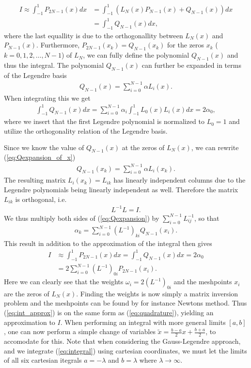 \documentclass[10pt, twocolumn]{aastex62}
\begin{document}
\begin{align}
	I \approx \int^1_{-1} P_{2N-1}(x) dx &= \int^1_{-1} (L_N(x)P_{N-1}(x) + Q_{N-1}(x))dx \\
	&= \int^1_{-1}Q_{N-1}(x)dx,
\end{align}
where the last equallity is due to the orthogonallity between $L_N(x)$ and
$P_{N-1}(x)$. Furthermore, $P_{2N-1}(x_k) = Q_{N-1}(x_k)$ for the zeros $x_k$
($k = 0, 1, 2,\ldots, N-1$) of $L_N$, we can fully define the polynomial
$Q_{N-1}(x)$ and thus the integral. The polynomial $Q_{N-1}(x)$ can further be
expanded in terms of the Legendre basis 
\begin{align}
	Q_{N-1}(x) = \sum^{N-1}_{i=0} \alpha L_i(x).
	\label{eq:Qexpansion_of_x}
\end{align}
When integrating this we get
\begin{align}
	\int^1_{-1}Q_{N-1}(x)dx = \sum^{N-1}_{i=0} \alpha_i\int^1_{-1}L_0(x)L_i(x) dx = 2\alpha_0,
\end{align}
where we insert that the first Legendre polynomial is normalized to $L_0 = 1$
and utilize the orthogonality relation of the Legendre basis.

Since we know the value of $Q_{N-1}(x)$ at the zeros of $L_N(x)$, we can rewrite
(\ref{eq:Qexpansion_of_x})
\begin{align}
	Q_{N-1} (x_k)= \sum^{N-1}_{i=0} \alpha L_i(x_k).
	\label{eq:Qexpansion}
\end{align}
The resulting matrix $L_i(x_k) = L_{ik}$ has linearly independent columns due to
the Legendre polynomials being linearly independent as well. Therefore the
matrix $L_{ik}$ is orthogonal, i.e.
\begin{align}
	L^{-1}L = I.
\end{align}
We thus multiply both sides of (\ref{eq:Qexpansion}) by
$\sum^{N-1}_{i=0}L^{-1}_{ij}$, so that 
\begin{align}
	\alpha_k = \sum_{i=0}^{N-1} (L^{-1})_{ki}Q_{N-1}(x_i).
\end{align}
This result in addition to the approximation of the integral then gives
\begin{align}
	I &\approx \int^1_{-1} P_{2N-1}(x)dx = \int^1_{-1} Q_{N-1}(x)dx = 2\alpha_0 \\
	&= 2 \sum^{N-1}_{i=0} (L^{-1})_{0i}P_{2N-1}(x_i).
	\label{eq:int_approx}
\end{align}
Here we can clearly see that the weights $\omega_i = 2(L^{-1})_{0i}$ and the
meshpoints $x_i$ are the zeros of $L_N(x)$. Finding the weights is now simply a
matrix inversion problem and the meshpoints can be found by for instance Newtons
method. Thus (\ref{eq:int_approx}) is on the same form as (\ref{eq:quadrature}),
yielding an approximation to $I$. When performing an integral with more general
limits $[a,b]$, one can now perform a simple change of variables $\tilde{x} =
\frac{b - a}{2}x + \frac{b + a}{2}$, to accomodate for this. Note that when
considering the Gauss-Legendre approach, and we integrate (\ref{eq:integral})
using cartesian coordinates, we must let the limits of all six cartesian
itegrals $a = -\lambda$ and $b = \lambda$ where $\lambda\to\infty$.
\end{document}
